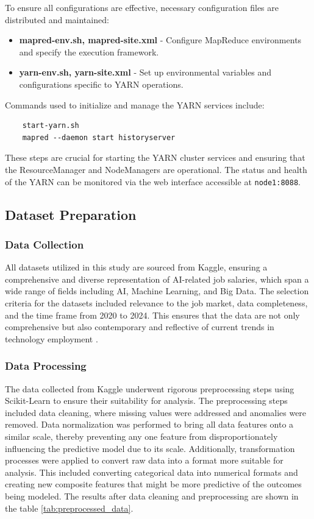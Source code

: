 \documentclass[12pt,a4paper]{article}
\begin{document}
\begin{multicols}{2}
To ensure all configurations are effective, necessary configuration files are distributed and maintained:
\begin{itemize}
    \item \textbf{mapred-env.sh, mapred-site.xml} - Configure MapReduce environments and specify the execution framework.
    \item \textbf{yarn-env.sh, yarn-site.xml} - Set up environmental variables and configurations specific to YARN operations.
\end{itemize}

Commands used to initialize and manage the YARN services include:

\begin{lstlisting}
    start-yarn.sh
    mapred --daemon start historyserver
\end{lstlisting}

These steps are crucial for starting the YARN cluster services and ensuring that the ResourceManager and NodeManagers are operational. The status and health of the YARN can be monitored via the web interface accessible at \texttt{node1:8088}.


\subsection{Dataset Preparation}
\subsubsection{Data Collection}
All datasets utilized in this study are sourced from Kaggle, ensuring a comprehensive and diverse representation of AI-related job salaries, which span a wide range of fields including AI, Machine Learning, and Big Data. The selection criteria for the datasets included relevance to the job market, data completeness, and the time frame from 2020 to 2024. This ensures that the data are not only comprehensive but also contemporary and reflective of current trends in technology employment \cite{jahid2024global, aijobs2024global, felinto2024eda, zangari2024jobs}.



\subsubsection{Data Processing}
The data collected from Kaggle underwent rigorous preprocessing steps using Scikit-Learn to ensure their suitability for analysis. The preprocessing steps included data cleaning, where missing values were addressed and anomalies were removed. Data normalization was performed to bring all data features onto a similar scale, thereby preventing any one feature from disproportionately influencing the predictive model due to its scale. Additionally, transformation processes were applied to convert raw data into a format more suitable for analysis. This included converting categorical data into numerical formats and creating new composite features that might be more predictive of the outcomes being modeled. The results after data cleaning and preprocessing are shown in the table \ref{tab:preprocessed_data}.


\end{multicols}
\end{document}
